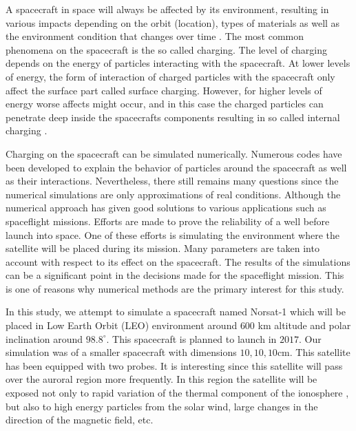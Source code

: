 

A spacecraft in space will always be affected by its environment, resulting in various
impacts depending on the orbit (location), types of materials as well as the environment
condition that changes over time \citep{trove.nla.gov.au/work/21680840}. The  most common phenomena on the spacecraft is the so
called charging. The level of charging depends on the energy of particles interacting with
the spacecraft. At lower levels of energy, the form of interaction of charged particles with the
spacecraft only affect the surface part called surface charging. However, for higher levels of energy
worse affects might occur, and in this case the charged particles
can penetrate deep inside the spacecrafts components resulting in so called internal charging \citep{fennell2001spacecraft}.

Charging on the spacecraft can be simulated numerically. Numerous codes have been developed
to explain the behavior of particles around the spacecraft as well as their interactions.
Nevertheless, there still remains many questions since the numerical simulations are only approximations
of real conditions. Although the numerical approach has given good solutions to various applications
such as spaceflight missions. Efforts are made to prove the reliability of a well before launch into space.
One of these efforts is simulating the environment where the satellite will be placed during its mission.
Many parameters are taken into account with respect to its effect on the spacecraft.
The results of the simulations can be a significant point in the decisions made for the spaceflight
mission. This is one of reasons why numerical methods are the primary interest for this study.

In this study, we attempt to simulate a spacecraft named Norsat-1 which will be placed in
Low Earth Orbit (LEO) environment around \(600\) km altitude and polar inclination around \(98.8^\circ\).
This spacecraft is planned to launch in \(2017\)\citep{norSat}. Our simulation was of a smaller spacecraft with dimensions
\(10,10,10\)cm.
This satellite
has been equipped with two probes. It is interesting since this satellite will pass over
the auroral region more frequently. In this region  the satellite will be exposed not only to
rapid variation of the thermal component of the ionosphere \citep{hastings1995review}, but also to high
energy particles from the solar wind, large changes in the direction of the magnetic field, etc.

